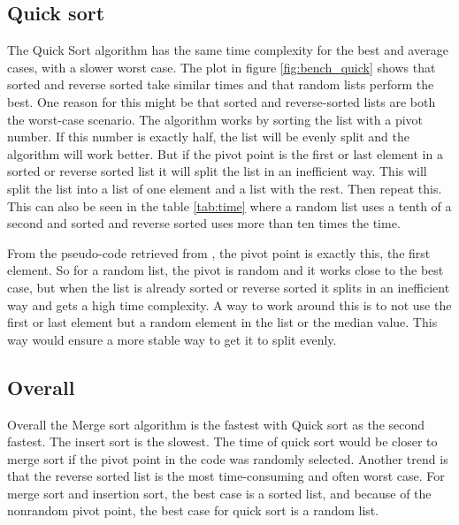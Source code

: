 \documentclass[sigconf, nonacm, natbib, screen, balance=False, 9.5pt]{acmart}
\begin{document}
\subsection{Quick sort}

 The Quick Sort algorithm has the same time complexity for the best and average cases, with a slower worst case. The plot in figure \ref{fig:bench_quick} shows that sorted and reverse sorted take similar times and that random lists perform the best. One reason for this might be that sorted and reverse-sorted lists are both the worst-case scenario. The algorithm works by sorting the list with a pivot number. If this number is exactly half, the list will be evenly split and the algorithm will work better. But if the pivot point is the first or last element in a sorted or reverse sorted list it will split the list in an inefficient way. This will split the list into a list of one element and a list with the rest. Then repeat this. This can also be seen in the table \ref{tab:time} where a random list uses a tenth of a second and sorted and reverse sorted uses more than ten times the time.
 
 From the pseudo-code retrieved from \cite{CLRS_2009}, the pivot point is exactly this, the first element. So for a random list, the pivot is random and it works close to the best case, but when the list is already sorted or reverse sorted it splits in an inefficient way and gets a high time complexity. A way to work around this is to not use the first or last element but a random element in the list or the median value. This way would ensure a more stable way to get it to split evenly.


\subsection{Overall}

Overall the Merge sort algorithm is the fastest with Quick sort as the second fastest. The insert sort is the slowest. The time of quick sort would be closer to merge sort if the pivot point in the code was randomly selected.
Another trend is that the reverse sorted list is the most time-consuming and often worst case. For merge sort and insertion sort, the best case is a sorted list, and because of the nonrandom pivot point, the best case for quick sort is a random list.



\end{document}
